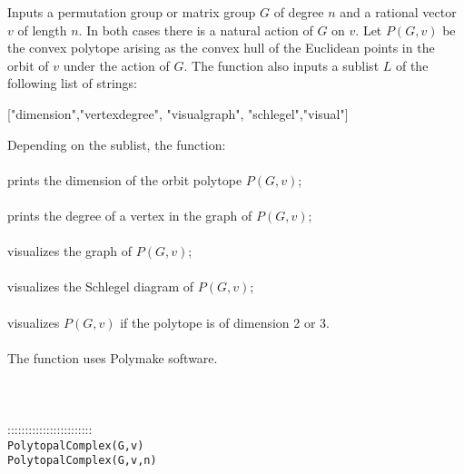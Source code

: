 \documentclass[a4paper,11pt]{report}
\begin{document}
{ Inputs a permutation group or matrix group $G$ of degree $n$ and a rational vector $v$ of length $n$. In both cases there is a natural action of $G$ on $v$. Let $P(G,v)$ be the convex polytope arising as the convex hull of the Euclidean points in
the orbit of $v$ under the action of $G$. The function also inputs a sublist $L$ of the following list of strings: 

 ["dimension","vertex{\textunderscore}degree", "visual{\textunderscore}graph",
"schlegel","visual"] 

 Depending on the sublist, the function: \\
 \\
 prints the dimension of the orbit polytope $P(G,v)$;\\
 \\
 prints the degree of a vertex in the graph of $P(G,v)$;\\
 \\
 visualizes the graph of $P(G,v)$;\\
 \\
 visualizes the Schlegel diagram of $P(G,v)$;\\
 \\
 visualizes $P(G,v)$ if the polytope is of dimension 2 or 3.\\
 \\
 The function uses Polymake software. \\
 \\
 \\
 \\
 ::::::::::::::::::::::::\\
 \texttt{PolytopalComplex(G,v) }\\
 \texttt{PolytopalComplex(G,v,n) }\\
 

}
\end{document}

